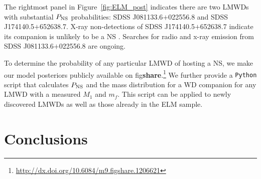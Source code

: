 \documentclass[apjl]{emulateapj}
\newcommand{\mf}{m_f}
\begin{document}
The rightmost panel in Figure~\ref{fig:ELM_post} indicates there are two LMWDs with substantial $P_{\rm NS}$ probabilities: SDSS J081133.6$+$022556.8 and SDSS J174140.5$+$652638.7. X-ray non-detections of SDSS J174140.5$+$652638.7 indicate its companion is unlikely to be a NS \citep{kilic14}. Searches for radio and x-ray emission from SDSS J081133.6$+$022556.8 are ongoing.






To determine the probability of any particular LMWD of hosting a NS, we make our model posteriors publicly available on fig{\bf share}.\footnote{\url{http://dx.doi.org/10.6084/m9.figshare.1206621}} We further provide a {\tt Python} script that calculates $P_{\rm NS}$ and the mass distribution for a WD companion for any LMWD with a measured $M_1$ and $\mf$. This script can be applied to newly discovered LMWDs as well as those already in the ELM sample.



\section{Conclusions}
\end{document}
